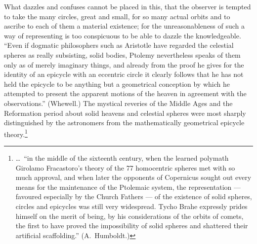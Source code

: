 \documentclass[12pt,a4paper]{book}
\begin{document}
What dazzles and confuses cannot be placed in this, that the observer is tempted to take the many
circles, great and small, for so many actual orbits and to ascribe to each of them a material existence;
for the unreasonableness of such a way of representing is too conspicuous to be able to dazzle the
knowledgeable. ``Even if dogmatic philosophers such as Aristotle have regarded the celestial spheres as
really subsisting, solid bodies, Ptolemy nevertheless speaks of them only as of merely imaginary things,
and already from the proof he gives for the identity of an epicycle with an eccentric circle it clearly
follows that he has not held the epicycle to be anything but a geometrical conception by which he
attempted to present the apparent motions of the heaven in agreement with the observations.'' (Whewell.)
The mystical reveries of the Middle Ages and the Reformation period about solid heavens and celestial
spheres were most sharply distinguished by the astronomers from the mathematically geometrical epicycle
theory.\footnote{%
\dots\ ``in the middle of the sixteenth century, when the learned polymath Girolamo Fracastoro's theory
of the 77 homocentric spheres met with so much approval, and when later the opponents of Copernicus
sought out every means for the maintenance of the Ptolemaic system, the representation --- favoured
especially by the Church Fathers --- of the existence of solid spheres, circles and epicycles was still
very widespread. Tycho Brahe expressly prides himself on the merit of being, by his considerations of
the orbits of comets, the first to have proved the impossibility of solid spheres and shattered their
artificial scaffolding.'' (A.\ Humboldt.)}
\end{document}

